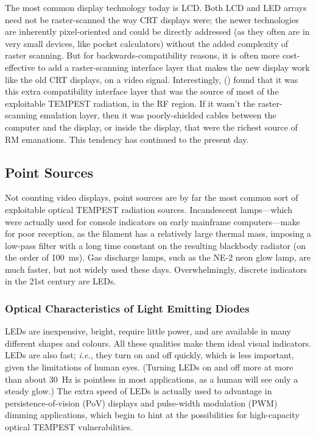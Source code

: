 \documentclass[a4paper,twoside,11pt,openany]{book}
\begin{document}
The most common display technology today is LCD. Both LCD and LED arrays need
not be raster-scanned the way CRT displays were; the newer technologies are
inherently pixel-oriented and could be directly addressed (as they often are in
very small devices, like pocket calculators) without the added complexity of
raster scanning. But for backwards-compatibility reasons, it is often more
cost-effective to add a raster-scanning interface layer that makes the new
display work like the old CRT displays, on a video signal. Interestingly,
\citeauthor{Kuhn2002} (\citeyear{Kuhn2002}) found that it was this extra
compatibility interface layer that was the source of most of the exploitable
TEMPEST radiation, in the RF region. If it wasn't the raster-scanning emulation
layer, then it was poorly-shielded cables between the computer and the display,
or inside the display, that were the richest source of RM emanations. This
tendency has continued to the present day.

\subsection{Point Sources}\label{section:incandescent}

Not counting video displays, point sources are by far the most common sort of
exploitable optical TEMPEST radiation sources. Incandescent lamps---which were
actually used for console indicators on early mainframe computers---make for
poor reception, as the filament has a relatively large thermal mass, imposing a
low-pass filter with a long time constant on the resulting blackbody radiator
(on the order of \SI{100}{\milli\second}). Gas discharge lamps, such as the
NE-2 neon glow lamp, are much faster, but not widely used these days.
Overwhelmingly, discrete indicators in the 21st century are LEDs.

\subsubsection{Optical Characteristics of Light Emitting Diodes}

LEDs are inexpensive, bright, require little power, and are available in many
different shapes and colours. All these qualities make them ideal visual
indicators. LEDs are also fast; {\it i.e.}, they turn on and off quickly, which
is less important, given the limitations of human eyes. (Turning LEDs on and
off more at more than about \SI{30}{\hertz} is pointless in most applications,
as a human will see only a steady glow.) The extra speed of LEDs is actually
used to advantage in persistence-of-vision (PoV) displays and pulse-width
modulation (PWM) dimming applications, which begin to hint at the possibilities
for high-capacity optical TEMPEST vulnerabilities.
\end{document}
